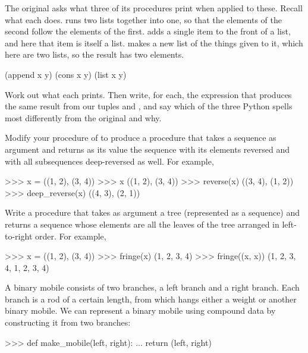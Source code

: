 \begin{exerciseGroup}
The original asks what three of its procedures print when applied to these.
Recall what each does.   runs two lists together into one, so that
the elements of the second follow the elements of the first.   adds
a single item to the front of a list, and here that item is itself a list.
 makes a new list of the things given to it, which here are two
lists, so the result has two elements.

\begin{codeBlock}
(append x y)
(cons x y)
(list x y)
\end{codeBlock}

Work out what each prints.  Then write, for each, the expression that produces
the same result from our tuples  and , and say which of the
three Python spells most differently from the original and why.

\label{Exercise 2.27}
 Modify your 
procedure of  to produce a  procedure
that takes a sequence as argument and returns as its value the sequence with
its elements reversed and with all subsequences deep-reversed as well.  For
example,

\begin{codeBlock}
>>> x = ((1, 2), (3, 4))
>>> x
((1, 2), (3, 4))
>>> reverse(x)
((3, 4), (1, 2))
>>> deep_reverse(x)
((4, 3), (2, 1))
\end{codeBlock}

\label{Exercise 2.28}
 Write a procedure 
that takes as argument a tree (represented as a sequence) and returns a
sequence whose elements are all the leaves of the tree arranged in
left-to-right order.  For example,

\begin{codeBlock}
>>> x = ((1, 2), (3, 4))
>>> fringe(x)
(1, 2, 3, 4)
>>> fringe((x, x))
(1, 2, 3, 4, 1, 2, 3, 4)
\end{codeBlock}

\label{Exercise 2.29}
 A binary mobile consists of two
branches, a left branch and a right branch.  Each branch is a rod of a certain
length, from which hangs either a weight or another binary mobile.  We can
represent a binary mobile using compound data by constructing it from two
branches:

\begin{codeBlock}
>>> def make_mobile(left, right):
...     return (left, right)
\end{codeBlock}


\end{exerciseGroup}
